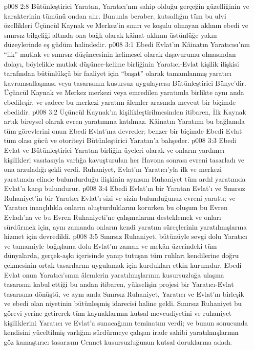 \vs p008 2:8 Bütünleştirici Yaratan, Yaratıcı’nın sahip olduğu gerçeğin güzelliğinin ve karakterinin tümünü ondan alır. Bununla beraber, kutsallığın tüm bu ulvi özellikleri Üçüncül Kaynak ve Merkez’in sınırı ve koşulu olmayan aklının ebedi ve sınırsız bilgeliği altında ona bağlı olarak kâinat aklının üstünlüğe yakın düzeylerinde eş güdüm halindedir.
\vs p008 3:1 Ebedi Evlat’ın Kâinatın Yaratıcısı’nın “ilk” mutlak ve sınırsız düşüncesinin kelimesel olarak dışavurumu olmasından dolayı, böylelikle mutlak düşünce\hyp{}kelime birliğinin Yaratıcı\hyp{}Evlat kişilik ilişkisi tarafından bütünlükçü bir faaliyet için “başat” olarak tamamlanmış yaratıcı kavramsallaşması veya tasarısının kusursuz uygulayıcısı Bütünleştirici Bünye’dir. Üçüncül Kaynak ve Merkez merkezi veya emredilen yaratımla birlikte aynı anda ebedileşir, ve sadece bu merkezi yaratım âlemler arasında mevcut bir biçimde ebedidir.
\vs p008 3:2 Üçüncül Kaynak’ın kişilikleştirilmesinden itibaren, İlk Kaynak artık bireysel olarak evren yaratımına katılmaz. Kâinatın Yaratımı bu bağlamda tüm görevlerini onun Ebedi Evlat’ına devreder; benzer bir biçimde Ebedi Evlat tüm olası gücü ve otoriteyi Bütünleştirici Yaratan’a bahşeder.
\vs p008 3:3 Ebedi Evlat ve Bütünleştirici Yaratan birliğin üyeleri olarak ve onların yardımcı kişilikleri vasıtasıyla varlığa kavuşturulan her Havona sonrası evreni tasarladı ve ona arzuladığı şekli verdi. Ruhaniyet, Evlat’ın Yaratıcı’yla ilk ve merkezi yaratımda elinde bulundurduğu ilişkinin aynısını Ruhaniyet tüm ardıl yaratımda Evlat’a karşı bulundurur.
\vs p008 3:4 Ebedi Evlat’ın bir Yaratan Evlat’ı ve Sınırsız Ruhaniyet’in bir Yaratıcı Evlat’ı sizi ve sizin bulunduğunuz evreni yarattı; ve Yaratıcı inançlılıkla onların oluşturduklarını korurken bu oluşum bu Evren Evladı’na ve bu Evren Ruhaniyeti’ne çalışmalarını desteklemek ve onları sürdürmek için, aynı zamanda onların kendi yaratım süreçlerinin yaratılmışlarına hizmet için devredildi.
\vs p008 3:5 Sınırsız Ruhaniyet, bütünüyle sevgi dolu Yaratıcı ve tamamiyle bağışlama dolu Evlat’ın zaman ve mekân üzerindeki tüm dünyalarda, gerçek\hyp{}aşkı içerisinde yanıp tutuşan tüm ruhları kendilerine doğru çekmesinin ortak tasarılarını uygulamak için kurdukları etkin kurumdur. Ebedi Evlat onun Yaratıcı’sının âlemlerin yaratılmışlarının kusursuzluğa ulaşma tasarısını kabul ettiği bu andan itibaren, yükselişin projesi bir Yaratıcı\hyp{}Evlat tasarısına dönüştü, ve aynı anda Sınırsız Ruhaniyet, Yaratıcı ve Evlat’ın birleşik ve ebedi olan niyetinin bütünleşmiş idarecisi haline geldi. Sınırsız Ruhaniyet bu görevi yerine getirerek tüm kaynaklarının kutsal mevcudiyetini ve ruhaniyet kişiliklerini Yaratıcı ve Evlat’a sunacağının teminatını verdi; ve bunun sonucunda kendisini yüceltilmiş varlığını sürdürmeye çalışan irade sahibi yaratılmışlarının göz kamaştırıcı tasarısını  Cennet kusursuzluğunun kutsal doruklarına adadı.
